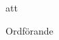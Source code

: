 \documentclass[../_main/handlingar.tex]{subfiles}
\begin{document}
\motionssvar



\begin{attsatser}
    \att att
\end{attsatser}

\begin{signatures}{1}
    \ist
    \signature{Fredrik Peterson}{Ordförande}
\end{signatures}
\end{document}
